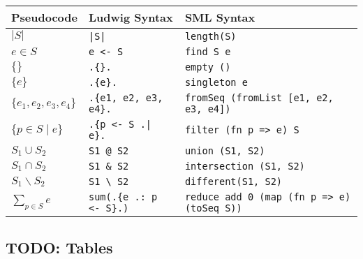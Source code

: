 \begin{tabular}{| l l l |}
\hline
\textbf{Pseudocode} & \textbf{Ludwig Syntax} & \textbf{SML Syntax}\\
\hline
$|S|$ & \verb"|S|" & \verb"length(S)"\\
$e \in S$ & \verb"e <- S" & \verb"find S e"\\
$\{\}$ & \verb".{}." & \verb"empty ()"\\
$\{e\}$ & \verb".{e}." & \verb"singleton e"\\
$\{e_1, e_2, e_3, e_4\}$ & \verb".{e1, e2, e3, e4}." & \verb"fromSeq (fromList [e1, e2, e3, e4])"\\
$\{p \in S \mid e\}$ & \verb".{p <- S .| e}." & \verb"filter (fn p => e) S"\\
$S_1 \cup S_2$ & \verb"S1 @ S2" & \verb"union (S1, S2)"\\
$S_1 \cap S_2$ & \verb"S1 & S2" & \verb"intersection (S1, S2)"\\
$S_1 \backslash S_2$ & \verb"S1 \ S2" & \verb"different(S1, S2)"\\
$\displaystyle \sum_{p \in S}{e}$ & \verb"sum(.{e .: p <- S}.)" & \verb"reduce add 0 (map (fn p => e) (toSeq S))"\\
\hline
\end{tabular}

\subsection{TODO: Tables}

